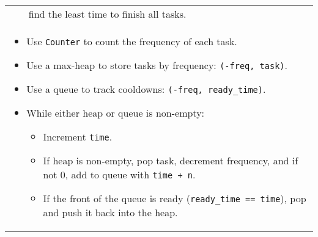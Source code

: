 \begin{summary}
\begin{center}
\begin{tabular}{ll}
            & find the least time to finish all tasks. \\
            \multicolumn{2}{p{\linewidth}}{
                \begin{itemize}
                    \item Use \texttt{Counter} to count the frequency of each task.
                    \item Use a max-heap to store tasks by frequency: \texttt{(-freq, task)}.
                    \item Use a queue to track cooldowns: \texttt{(-freq, ready\_time)}.
                    \item While either heap or queue is non-empty:
                    \begin{itemize}[noitemsep]
                        \item Increment \texttt{time}.
                        \item If heap is non-empty, pop task, decrement frequency, and if not 0, add to queue with \texttt{time + n}.
                        \item If the front of the queue is ready (\texttt{ready\_time == time}), pop and push it back into the heap.
                    \end{itemize}
                \end{itemize}
                } \\
        \end{tabular}
    \end{center}
\end{summary}
\newpage

